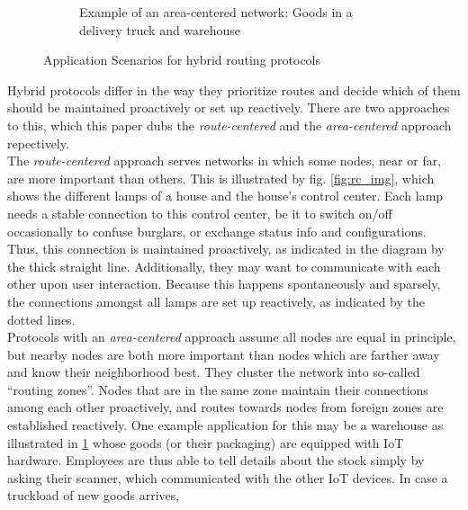 \documentclass[a4paper,10pt]{scrartcl}
\begin{document}
\begin{figure}
\begin{subfigure}[b]{0.5\textwidth}
                \caption{Example of an area-centered network: Goods in a delivery truck and warehouse}
                \label{fig:ac_img}
        \end{subfigure}
        \caption{Application Scenarios for hybrid routing protocols}\label{fig:scope}
\end{figure}

Hybrid protocols differ in the way they prioritize routes and decide which of them should be maintained proactively or set up reactively. There are two approaches to this, which this paper dubs the \emph{route-centered} and the \emph{area-centered} approach repectively.\\

The \emph{route-centered} approach serves networks in which some nodes, near or far, are more important than others. This is illustrated by fig. \ref{fig:rc_img}, which shows the different lamps of a house and the house's control center. Each lamp needs a stable connection to this control center, be it to switch on/off occasionally to confuse burglars, or exchange status info and configurations. Thus, this connection is maintained proactively, as indicated in the diagram by the thick straight line. Additionally, they may want to communicate with each other upon user interaction. Because this happens spontaneously and sparsely, the connections amongst all lamps are set up reactively, as indicated by the dotted lines.\\
Protocols with an \emph{area-centered} approach assume all nodes are equal in principle, but nearby nodes are both more important than nodes which are farther away and know their neighborhood best. They cluster the network into so-called ``routing zones''. Nodes that are in the same zone maintain their connections among each other proactively, and routes towards nodes from foreign zones are established reactively. 
One example application for this may be a warehouse as illustrated in \ref{fig:ac_img} whose goods (or their packaging) are equipped with IoT hardware. Employees are thus able to tell details about the stock simply by asking their scanner, which communicated with the other IoT devices. In case a truckload of new goods arrives, 

\end{document}
